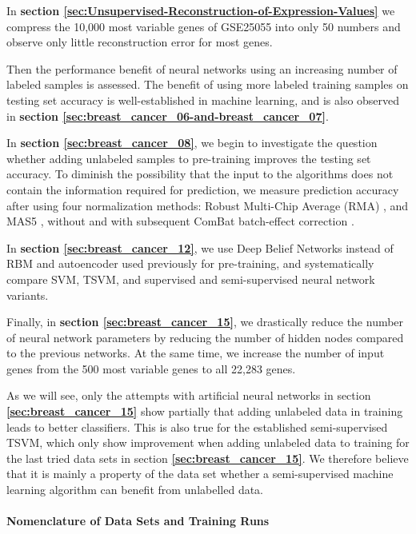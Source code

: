In \textbf{section \ref{sec:Unsupervised-Reconstruction-of-Expression-Values}}
we compress the 10,000 most variable genes of GSE25055 into only 50
numbers and observe only little reconstruction error for most genes.

Then the performance benefit of neural networks using an increasing
number of labeled samples is assessed. The benefit of using more labeled
training samples on testing set accuracy is well-established in machine
learning, and is also observed in \textbf{section \ref{sec:breast_cancer_06-and-breast_cancer_07}}.

In \textbf{section \ref{sec:breast_cancer_08}}, we begin to investigate
the question whether adding unlabeled samples to pre-training improves
the testing set accuracy. To diminish the possibility that the input
to the algorithms does not contain the information required for prediction,
we measure prediction accuracy after using four normalization methods:
Robust Multi-Chip Average (RMA) \cite{BolstadSpeed2003}, and MAS5
\cite{Affymetrix2001}, without and with subsequent ComBat batch-effect
correction \cite{JohnsonRabinovic2007}.

In \textbf{section \ref{sec:breast_cancer_12}}, we use Deep Belief
Networks instead of RBM and autoencoder used previously for pre-training,
and systematically compare SVM, TSVM, and supervised and semi-supervised
neural network variants.

Finally, in \textbf{section \ref{sec:breast_cancer_15}}, we drastically
reduce the number of neural network parameters by reducing the number
of hidden nodes compared to the previous networks. At the same time,
we increase the number of input genes from the 500 most variable genes
to all 22,283 genes.

As we will see, only the attempts with artificial neural networks
in section \textbf{\ref{sec:breast_cancer_15}} show partially that
adding unlabeled data in training leads to  better classifiers. This
is also true for the established semi-supervised TSVM, which only
show improvement when adding unlabeled data to training for the last
tried data sets in section \textbf{\ref{sec:breast_cancer_15}}. We
therefore believe that it is mainly a property of the data set whether
a semi-supervised machine learning algorithm can benefit from unlabelled
data.

\paragraph{Nomenclature of Data Sets and Training Runs}

